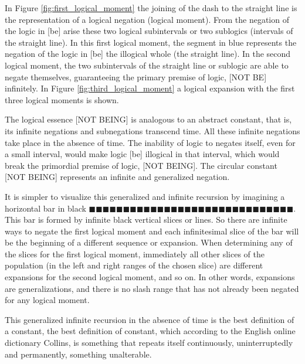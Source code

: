 In Figure \ref{fig:first_logical_moment} the joining of the dash to the straight line is the representation of a logical negation (logical moment). From the negation of the logic in [be] arise these two logical subintervals or two sublogics (intervals of the straight line). In this first logical moment, the segment in blue represents the negation of the logic in [be] the illogical whole (the straight line). In the second logical moment, the two subintervals of the straight line or sublogic are able to negate themselves, guaranteeing the primary premise of logic, [NOT BE] infinitely. In Figure \ref{fig:third_logical_moment} a logical expansion with the first three logical moments is shown.

The logical essence [NOT BEING] is analogous to an abstract constant, that is, its infinite negations and subnegations transcend time. All these infinite negations take place in the absence of time. The inability of logic to negates itself, even for a small interval, would make logic [be] illogical in that interval, which would break the primordial premise of logic, [NOT BEING]. The circular constant [NOT BEING] represents an infinite and generalized negation.

It is simpler to visualize this generalized and infinite recursion by imagining a horizontal bar in black $\!\blacksquare\!\blacksquare\!\blacksquare\!\blacksquare\!\blacksquare\!\blacksquare\!\blacksquare\!\blacksquare\!\blacksquare\!\blacksquare\!\blacksquare\!\blacksquare\!\blacksquare\!\blacksquare\!\blacksquare\!\blacksquare\!\blacksquare\!\blacksquare\!\blacksquare\!\blacksquare\!\blacksquare\!\blacksquare\!\blacksquare\!\blacksquare\!\blacksquare\!\blacksquare\!\blacksquare\!\blacksquare\!\blacksquare\!\blacksquare$. This bar is formed by infinite black vertical slices or lines. So there are infinite ways to negate the first logical moment and each infinitesimal slice of the bar will be the beginning of a different sequence or expansion. When determining any of the slices for the first logical moment, immediately all other slices of the population (in the left and right ranges of the chosen slice) are different expansions for the second logical moment, and so on. In other words, expansions are generalizations, and there is no slash range that has not already been negated for any logical moment.

This generalized infinite recursion in the absence of time is the best definition of a constant, the best definition of constant, which according to the English online dictionary Collins\cite{dic_constant}, is something that repeats itself continuously, uninterruptedly and permanently, something unalterable.

